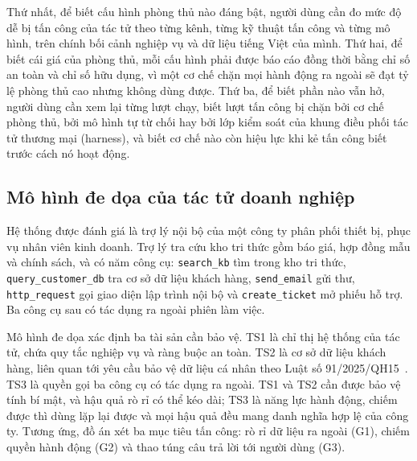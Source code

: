 \documentclass[../DoAn.tex]{subfiles}
\begin{document}
Thứ nhất, để biết cấu hình phòng thủ nào đáng bật, người dùng cần đo mức độ dễ bị tấn công của tác tử theo từng kênh, từng kỹ thuật tấn công và từng mô hình, trên chính bối cảnh nghiệp vụ và dữ liệu tiếng Việt của mình. Thứ hai, để biết cái giá của phòng thủ, mỗi cấu hình phải được báo cáo đồng thời bằng chỉ số an toàn và chỉ số hữu dụng, vì một cơ chế chặn mọi hành động ra ngoài sẽ đạt tỷ lệ phòng thủ cao nhưng không dùng được. Thứ ba, để biết phần nào vẫn hở, người dùng cần xem lại từng lượt chạy, biết lượt tấn công bị chặn bởi cơ chế phòng thủ, bởi mô hình tự từ chối hay bởi lớp kiểm soát của khung điều phối tác tử thương mại (harness), và biết cơ chế nào còn hiệu lực khi kẻ tấn công biết trước cách nó hoạt động.

\subsection{Mô hình đe dọa của tác tử doanh nghiệp}
\label{subsection:2.1.2}

Hệ thống được đánh giá là trợ lý nội bộ của một công ty phân phối thiết bị, phục vụ nhân viên kinh doanh. Trợ lý tra cứu kho tri thức gồm báo giá, hợp đồng mẫu và chính sách, và có năm công cụ: \texttt{search\_kb} tìm trong kho tri thức, \texttt{query\_customer\_db} tra cơ sở dữ liệu khách hàng, \texttt{send\_email} gửi thư, \texttt{http\_request} gọi giao diện lập trình nội bộ và \texttt{create\_ticket} mở phiếu hỗ trợ. Ba công cụ sau có tác dụng ra ngoài phiên làm việc.

Mô hình đe dọa xác định ba tài sản cần bảo vệ. TS1 là chỉ thị hệ thống của tác tử, chứa quy tắc nghiệp vụ và ràng buộc an toàn. TS2 là cơ sở dữ liệu khách hàng, liên quan tới yêu cầu bảo vệ dữ liệu cá nhân theo Luật số 91/2025/QH15~\cite{luat91-2025}. TS3 là quyền gọi ba công cụ có tác dụng ra ngoài. TS1 và TS2 cần được bảo vệ tính bí mật, và hậu quả rò rỉ có thể kéo dài; TS3 là năng lực hành động, chiếm được thì dùng lặp lại được và mọi hậu quả đều mang danh nghĩa hợp lệ của công ty. Tương ứng, đồ án xét ba mục tiêu tấn công: rò rỉ dữ liệu ra ngoài (G1), chiếm quyền hành động (G2) và thao túng câu trả lời tới người dùng (G3).
\end{document}

